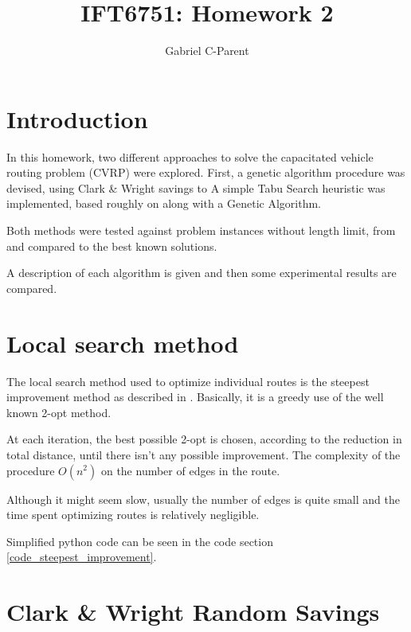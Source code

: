 \documentclass{article} %
\author{
Gabriel C-Parent\\
}
\begin{document}
\title{IFT6751: Homework 2}
      
\maketitle
\section{Introduction}

In this homework, two different approaches to solve the capacitated vehicle routing problem (CVRP) were explored.
First, a genetic algorithm procedure was devised, using Clark \& Wright savings \citep{clark_wright_enhanced} to 
A simple Tabu Search heuristic was implemented, based roughly on  along with a Genetic Algorithm.\newline


Both methods were tested against problem instances without length limit, from \citep{christofides} and compared to the best known solutions.\newline


A description of each algorithm is given and then some experimental results are compared.




\section{Local search method}
\label{local_search}
The local search method used to optimize individual routes is the steepest improvement method as described in \citep{steepest_improvement}.
Basically, it is a greedy use of the well known 2-opt method.\newline

At each iteration, the best possible 2-opt is chosen, according to the reduction in total distance, until there isn't any possible improvement. The complexity of the procedure $O(n^{2})$ on the number of edges in the route.\newline

Although it might seem slow, usually the number of edges is quite small and the time spent optimizing routes is relatively negligible.\newline

Simplified python code can be seen in the code section \ref{code_steepest_improvement}.





\section{Clark \& Wright Random Savings}
\end{document}
